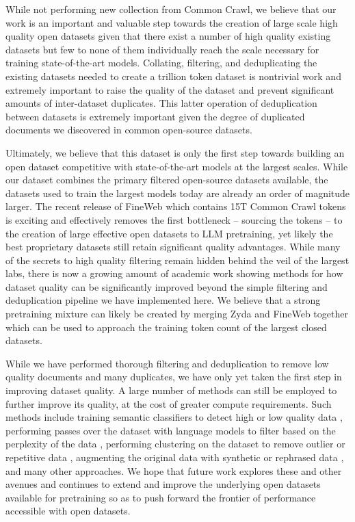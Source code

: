 \documentclass{article}
\begin{document}
While not performing new collection from Common Crawl, we believe that our work is an important and valuable step towards the creation of large scale high quality open datasets given that there exist a number of high quality existing datasets but few to none of them individually reach the scale necessary for training state-of-the-art models. Collating, filtering, and deduplicating the existing datasets needed to create a trillion token dataset is nontrivial work and extremely important to raise the quality of the dataset and prevent significant amounts of inter-dataset duplicates. This latter operation of deduplication between datasets is extremely important given the degree of duplicated documents we discovered in common open-source datasets.

Ultimately, we believe that this dataset is only the first step towards building an open dataset competitive with state-of-the-art models at the largest scales. While our dataset combines the primary filtered open-source datasets available, the datasets used to train the largest models today are already an order of magnitude larger. The recent release of FineWeb \citep{penedo2024fineweb} which contains 15T Common Crawl tokens is exciting and effectively removes the first bottleneck -- sourcing the tokens -- to the creation of large effective open datasets to LLM pretraining, yet likely the best proprietary datasets still retain significant quality advantages. While many of the secrets to high quality filtering remain hidden behind the veil of the largest labs, there is now a growing amount of academic work showing methods for how dataset quality can be significantly improved beyond the simple filtering and deduplication pipeline we have implemented here. We believe that a strong pretraining mixture can likely be created by merging Zyda and FineWeb together which can be used to approach the training token count of the largest closed datasets.

While we have performed thorough filtering and deduplication to remove low quality documents and many duplicates, we have only yet taken the first step in improving dataset quality. A large number of methods can still be employed to further improve its quality, at the cost of greater compute requirements. Such methods include training semantic classifiers to detect high or low quality data \citep{xie2023data,ilyas2022datamodels}, performing passes over the dataset with language models to filter based on the perplexity of the data \citep{marion2023less}, performing clustering on the dataset to remove outlier or repetitive data \citep{tirumala2024d4}, augmenting the original data with synthetic or rephrased data \citep{maini2024rephrasing}, and many other approaches. We hope that future work explores these and other avenues and continues to extend and improve the underlying open datasets available for pretraining so as to push forward the frontier of performance accessible with open datasets.
\end{document}
